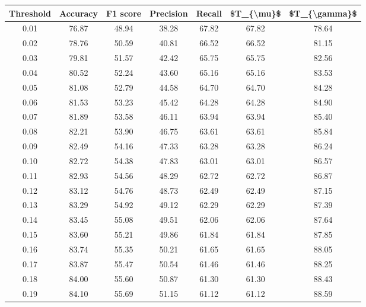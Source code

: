 \begin{tabular}{|c|c|c|c|c|c|c|}
\hline
 Threshold &  Accuracy &  F1 score &  Precision &  Recall &  \$T\_\{\textbackslash mu\}\$ &  \$T\_\{\textbackslash gamma\}\$ \\
\hline
      0.01 &     76.87 &     48.94 &      38.28 &   67.82 &      67.82 &         78.64 \\
      0.02 &     78.76 &     50.59 &      40.81 &   66.52 &      66.52 &         81.15 \\
      0.03 &     79.81 &     51.57 &      42.42 &   65.75 &      65.75 &         82.56 \\
      0.04 &     80.52 &     52.24 &      43.60 &   65.16 &      65.16 &         83.53 \\
      0.05 &     81.08 &     52.79 &      44.58 &   64.70 &      64.70 &         84.28 \\
      0.06 &     81.53 &     53.23 &      45.42 &   64.28 &      64.28 &         84.90 \\
      0.07 &     81.89 &     53.58 &      46.11 &   63.94 &      63.94 &         85.40 \\
      0.08 &     82.21 &     53.90 &      46.75 &   63.61 &      63.61 &         85.84 \\
      0.09 &     82.49 &     54.16 &      47.33 &   63.28 &      63.28 &         86.24 \\
      0.10 &     82.72 &     54.38 &      47.83 &   63.01 &      63.01 &         86.57 \\
      0.11 &     82.93 &     54.56 &      48.29 &   62.72 &      62.72 &         86.87 \\
      0.12 &     83.12 &     54.76 &      48.73 &   62.49 &      62.49 &         87.15 \\
      0.13 &     83.29 &     54.92 &      49.12 &   62.29 &      62.29 &         87.39 \\
      0.14 &     83.45 &     55.08 &      49.51 &   62.06 &      62.06 &         87.64 \\
      0.15 &     83.60 &     55.21 &      49.86 &   61.84 &      61.84 &         87.85 \\
      0.16 &     83.74 &     55.35 &      50.21 &   61.65 &      61.65 &         88.05 \\
      0.17 &     83.87 &     55.47 &      50.54 &   61.46 &      61.46 &         88.25 \\
      0.18 &     84.00 &     55.60 &      50.87 &   61.30 &      61.30 &         88.43 \\
      0.19 &     84.10 &     55.69 &      51.15 &   61.12 &      61.12 &         88.59 \\

\end{tabular}

